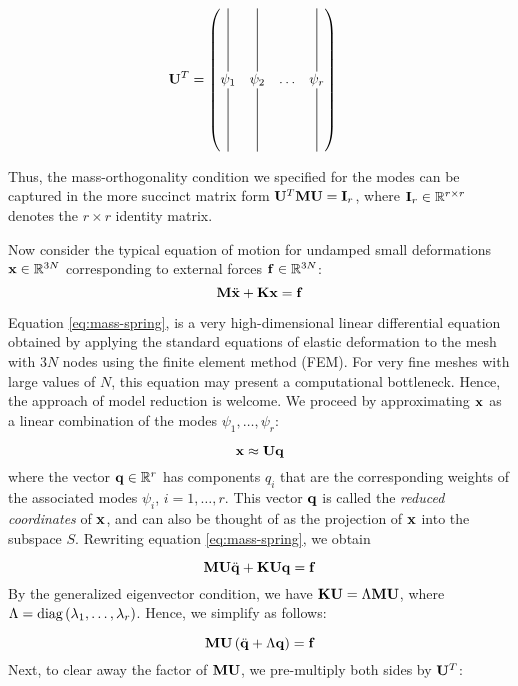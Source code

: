 \begin{align}
	\UU^{T} &= \begin{pmatrix}
	\vertbar & \vertbar &   & \vertbar \\
	\psi_1 & \psi_2 & \dots & \psi_r   \\
	\vertbar & \vertbar &   & \vertbar
  \end{pmatrix}
\end{align}

Thus, the mass-orthogonality condition we specified for the modes can be captured in the more succinct matrix form $\mathbf{U}^{T} \mathbf{M} \mathbf{U} = \mathbf{I}_r$,
where $\mathbf{I}_r \in \mathbb{R}^{r \times r}$ denotes the $r \times r$ identity matrix.

Now consider the typical equation of motion for undamped small deformations $\mathbf{x} \in \mathbb{R}^{3N}$ corresponding to external forces $\mathbf{f} \in \mathbb{R}^{3N}$: 
\begin{equation}
\label{eq:mass-spring}
\mathbf{M} \ddot{\mathbf{x}} + \mathbf{K} \mathbf{x} = \mathbf{f}
\end{equation}

Equation \ref{eq:mass-spring}, is a very high-dimensional linear differential equation obtained by applying the standard equations of elastic deformation to the mesh with $3N$ nodes using the finite element method (FEM). For very fine meshes with large values of $N$, this equation may present a computational bottleneck. Hence, the approach of model reduction is welcome. We proceed by approximating $\mathbf{x}$ as a linear combination of the modes $\psi_1, \dots, \psi_r$:

\begin{equation}
\mathbf{x} \approx \mathbf{U} \mathbf{q}
\end{equation}
where the vector $\mathbf{q} \in \mathbb{R}^{r}$ has components $q_i$ that are the corresponding weights of the associated modes $\psi_i$, $i=1,\dots,r$. This vector $\mathbf{q}$ is called the {\em reduced coordinates} of $\mathbf{x}$, and can also be thought of as the projection of $\mathbf{x}$ into the subspace $S$. Rewriting equation \ref{eq:mass-spring}, we obtain

\begin{equation}
\mathbf{M} {\mathbf{U} \ddot{\mathbf{q}}} + \mathbf{K} \mathbf{U} \mathbf{q} = \mathbf{f}
\end{equation}
By the generalized eigenvector condition, we have $\mathbf{K} \mathbf{U} = \Lambda \mathbf{M} \mathbf{U}$, where $\Lambda = \textnormal{diag}\left(\lambda_1, \dots, \lambda_r\right)$. Hence, we simplify as follows:

\begin{equation}
\mathbf{M} \mathbf{U} \left(\ddot{\mathbf{q}} + \Lambda \mathbf{q}\right) = \mathbf{f}
\end{equation}
Next, to clear away the factor of $\mathbf{M} \mathbf{U}$, we pre-multiply both sides by $\mathbf{U}^{T}$:

